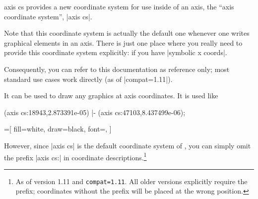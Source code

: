 \begin{coordinatesystem}{axis cs}
    \PGFPlots{} provides a new coordinate system for use inside of an axis, the
    ``axis coordinate system'', |axis cs|.

    Note that this coordinate system is actually the default one whenever one
    writes graphical elements in an axis. There is just one place where you
    really need to provide this coordinate system explicitly:  if you have
    |symbolic x coords|.

    Consequently, you can refer to this documentation as reference only; most
    standard use cases work directly (as of |compat=1.11|).

    It can be used to draw any \Tikz{} graphics at axis coordinates. It is used
    like
\begin{codeexample}
\draw
       (axis cs:18943,2.873391e-05)
    |- (axis cs:47103,8.437499e-06);
\end{codeexample}

\begin{codeexample}[]
=[
    fill=white,
    draw=black,
    font=\footnotesize,
]
\end{codeexample}

    However, since |axis cs| is the default coordinate system of \PGFPlots{},
    you can simply omit the prefix |axis cs:| in coordinate
    descriptions.\footnote{As of \PGFPlots{} version 1.11 and
    \verb|compat=1.11|. All older versions explicitly require the prefix;
    coordinates without the prefix will be placed at the wrong position.}
\begin{codeexample}[]
\end{codeexample}
\end{coordinatesystem}
